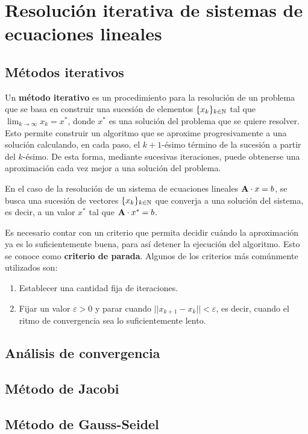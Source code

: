 
\section{Resolución iterativa de sistemas de ecuaciones lineales}
\subsection{Métodos iterativos}
Un \textbf{método iterativo} es un procedimiento para la resolución de un
problema que se basa en construir una sucesión de elementos $\lbrace x_k
\rbrace_{k \in \mathbb{N}}$ tal que $\lim_{k\to\infty} x_k = x^\ast$, donde $x^\ast$
es una solución del problema que se quiere resolver.
Esto permite construir un algoritmo que se aproxime progresivamente a una
solución calculando, en cada paso, el $k+1$-ésimo término de la sucesión a
partir del $k$-ésimo. De esta forma, mediante sucesivas iteraciones, puede
obtenerse una aproximación cada vez mejor a una solución del problema.

En el caso de la resolución de un sistema de ecuaciones lineales $\mathbf{A}
\cdot x = b$, se busca una sucesión de vectores $\lbrace x_k \rbrace_{k \in
\mathbb{N}}$ que converja a una solución del sistema, es decir, a un valor $x^\ast$
tal que $\mathbf{A} \cdot x^\ast = b$.

Es necesario contar con un criterio que permita decidir cuándo la aproximación
ya es lo suficientemente buena, para así detener la ejecución del algoritmo.
Esto se conoce como \textbf{criterio de parada}. Algunos de los criterios
más comúnmente utilizados son:
\begin{enumerate}[label=(\roman*)]
\item Establecer una cantidad fija de iteraciones.
\item Fijar un valor $\varepsilon > 0$ y parar cuando $||x_{k+1} - x_k||
    < \varepsilon$, es decir, cuando el ritmo de convergencia sea lo
    suficientemente lento.
\end{enumerate}

\subsection{Análisis de convergencia}
\subsection{Método de Jacobi}
\subsection{Método de Gauss-Seidel}
